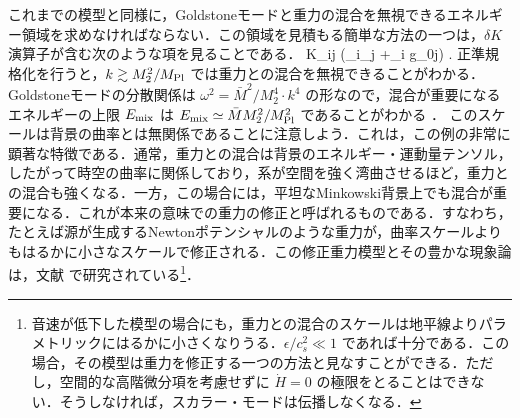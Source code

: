 これまでの模型と同様に，Goldstoneモードと重力の混合を無視できるエネルギー領域を求めなければならない．この領域を見積もる簡単な方法の一つは，$\delta K$ 演算子が含む次のような項を見ることである．
\be
\delta K_{ij} \supset (\partial_i\partial_j \pi +\partial_i g_{0j}) \;.
\ee
正準規格化を行うと，$k \gtrsim M_2^2/M_{\rm Pl}$ では重力との混合を無視できることがわかる．Goldstoneモードの分散関係は $\omega^2 = \bar M^2/M_2^4 \cdot k^4$ の形なので，混合が重要になるエネルギーの上限 $E_{\rm mix}$ は
$E_{\rm mix} \simeq \bar M M_2^2/M_{\rm Pl}^2$ であることがわかる \cite{Arkani-Hamed:2003pdi}．
このスケールは背景の曲率とは無関係であることに注意しよう．これは，この例の非常に顕著な特徴である．通常，重力との混合は背景のエネルギー・運動量テンソル，したがって時空の曲率に関係しており，系が空間を強く湾曲させるほど，重力との混合も強くなる．一方，この場合には，平坦なMinkowski背景上でも混合が重要になる．これが本来の意味での重力の修正と呼ばれるものである．すなわち，たとえば源が生成するNewtonポテンシャルのような重力が，曲率スケールよりもはるかに小さなスケールで修正される．この修正重力模型とその豊かな現象論は，文献 \cite{Arkani-Hamed:2003pdi} で研究されている\footnote{音速が低下した模型の場合にも，重力との混合のスケールは地平線よりパラメトリックにはるかに小さくなりうる．$\epsilon/c_s^2 \ll 1$ であれば十分である．この場合，その模型は重力を修正する一つの方法と見なすことができる．ただし，空間的な高階微分項を考慮せずに $\dot H = 0$ の極限をとることはできない．そうしなければ，スカラー・モードは伝播しなくなる．}．


